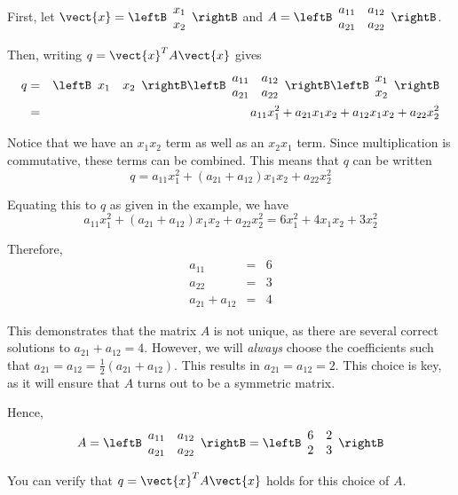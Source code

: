 \begin{solution}
First, let $\vect{x} = \leftB
\begin{array}{r}
x_1 \\
x_2
\end{array}
\rightB$ and $A = \leftB
\begin{array}{rr}
a_{11} & a_{12} \\
a_{21} & a_{22}
\end{array}
\rightB$. 

Then, writing $q = \vect{x}^TA\vect{x}$ gives 
\begin{eqnarray*}
q &=& \leftB \begin{array}{rr}
x_1 & x_2 
\end{array}
\rightB
\leftB \begin{array}{rr}
a_{11} & a_{12} \\
a_{21} & a_{22}
\end{array}
\rightB
\leftB \begin{array}{r}
x_1 \\
x_2 
\end{array}
\rightB \\
&=& a_{11}x_1^2 + a_{21}x_1x_2 + a_{12}x_1x_2 + a_{22}x_2^2
\end{eqnarray*}

Notice that we have an $x_1x_2$ term as well as an $x_2x_1$ term. Since multiplication is commutative, these terms can be combined. This means that $q$ can be written 
\[
q =  a_{11}x_1^2 + \left( a_{21}+ a_{12}\right) x_1x_2 + a_{22}x_2^2
\]

Equating this to $q$ as given in the example, we have 
\[
 a_{11}x_1^2 + \left( a_{21}+ a_{12}\right) x_1x_2 + a_{22}x_2^2 =  6x_1^2 + 4x_1x_2 + 3x_2^2
\]

Therefore,
\begin{eqnarray*}
a_{11} &=& 6 \\
a_{22} &=& 3 \\
a_{21}+a_{12} &=& 4
\end{eqnarray*}

This demonstrates that the matrix $A$ is not unique, as there are several correct solutions to $a_{21}+a_{12} = 4$. However, we will \textit{always} choose the coefficients such that $a_{21} = a_{12} = \frac{1}{2} (a_{21}+a_{12})$. This results in $a_{21} = a_{12} = 2$. This choice is key, as it will ensure that $A$ turns out to be a symmetric matrix.  

Hence, 
\[
A = 
\leftB \begin{array}{rr}
a_{11} & a_{12} \\
a_{21} & a_{22}
\end{array}
\rightB
=
\leftB
\begin{array}{rr}
6 & 2 \\
2 & 3
\end{array}
\rightB
\]

You can verify that $q = \vect{x}^T A \vect{x}$ holds for this choice of $A$. 
\end{solution}

